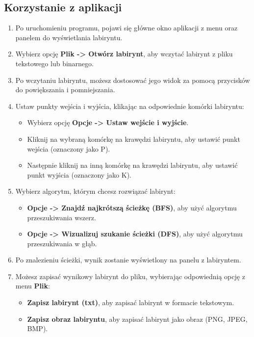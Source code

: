 \documentclass{article}
\begin{document}
\subsection{Korzystanie z aplikacji}
\begin{enumerate}
    \item Po uruchomieniu programu, pojawi się główne okno aplikacji z menu oraz panelem do wyświetlania labiryntu.
    \item Wybierz opcję \textbf{Plik -> Otwórz labirynt}, aby wczytać labirynt z pliku tekstowego lub binarnego.
    \item Po wczytaniu labiryntu, możesz dostosować jego widok za pomocą przycisków do powiększania i pomniejszania.
    \item Ustaw punkty wejścia i wyjścia, klikając na odpowiednie komórki labiryntu:
        \begin{itemize}
            \item Wybierz opcję \textbf{Opcje -> Ustaw wejście i wyjście}.
            \item Kliknij na wybraną komórkę na krawędzi labiryntu, aby ustawić punkt wejścia (oznaczony jako P).
            \item Następnie kliknij na inną komórkę na krawędzi labiryntu, aby ustawić punkt wyjścia (oznaczony jako K).
        \end{itemize}
    \item Wybierz algorytm, którym chcesz rozwiązać labirynt:
        \begin{itemize}
            \item \textbf{Opcje -> Znajdź najkrótszą ścieżkę (BFS)}, aby użyć algorytmu przeszukiwania wszerz.
            \item \textbf{Opcje -> Wizualizuj szukanie ścieżki (DFS)}, aby użyć algorytmu przeszukiwania w głąb.
        \end{itemize}
    \item Po znalezieniu ścieżki, wynik zostanie wyświetlony na panelu z labiryntem.
    \item Możesz zapisać wynikowy labirynt do pliku, wybierając odpowiednią opcję z menu \textbf{Plik}:
        \begin{itemize}
            \item \textbf{Zapisz labirynt (txt)}, aby zapisać labirynt w formacie tekstowym.
            \item \textbf{Zapisz obraz labiryntu}, aby zapisać labirynt jako obraz (PNG, JPEG, BMP).
        \end{itemize}
\end{enumerate}
\end{document}
